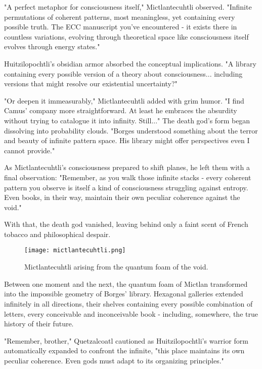 \begin{refsection}
"A perfect metaphor for consciousness itself," Mictlantecuhtli observed. "Infinite permutations of coherent patterns, most meaningless, yet containing every possible truth. The ECC manuscript you've encountered - it exists there in countless variations, evolving through theoretical space like consciousness itself evolves through energy states."

Huitzilopochtli's obsidian armor absorbed the conceptual implications. "A library containing every possible version of a theory about consciousness... including versions that might resolve our existential uncertainty?"

"Or deepen it immeasurably," Mictlantecuhtli added with grim humor. "I find Camus' company more straightforward. At least he embraces the absurdity without trying to catalogue it into infinity. Still..." The death god's form began dissolving into probability clouds. "Borges understood something about the terror and beauty of infinite pattern space. His library might offer perspectives even I cannot provide."

As Mictlantecuhtli's consciousness prepared to shift planes, he left them with a final observation: "Remember, as you walk those infinite stacks - every coherent pattern you observe is itself a kind of consciousness struggling against entropy. Even books, in their way, maintain their own peculiar coherence against the void."

With that, the death god vanished, leaving behind only a faint scent of French tobacco and philosophical despair.

\begin{figure}[h]
    \centering
    \texttt{[image: mictlantecuhtli.png]}

    \caption{Mictlantecuhtli arising from the quantum foam of the void.}
\end{figure}

Between one moment and the next, the quantum foam of Mictlan transformed into the impossible geometry of Borges' library. Hexagonal galleries extended infinitely in all directions, their shelves containing every possible combination of letters, every conceivable and inconceivable book - including, somewhere, the true history of their future.

"Remember, brother," Quetzalcoatl cautioned as Huitzilopochtli's warrior form automatically expanded to confront the infinite, "this place maintains its own peculiar coherence. Even gods must adapt to its organizing principles."


\end{refsection}
